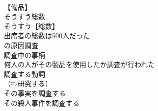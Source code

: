 \documentclass[8pt]{extreport}
\begin{document}
\begin{CJK}{UTF8}{min}
\\	【備品】
\\	そうすう総数		
\\	そうすう【総数】 
\\	出席者の総数は500人だった 
\\	[(達した) 
\\	測定（する）		
\\	そくてい【測定】名詞 
\\	時間の測定 
\\	測定する動詞 
\\	（⇨測る）
\\	対象		
\\	たいしょう【対象】 
\\	【行為思考感情などの】 
\\	〖非難などの〗
\\	研究の対象 
\\	[(題目) 
\\	輸入（ゆにゅう）制限（せいげん）の対象となっている食品（しょくひん） 
\\	彼のふるまいはしばしば非難の対象となった 
\\	【目標】 
\\	子供を対象とした本 
\\	この歴史書は高校生を対象に書かれている 
\\	調査（する）		
\\	ちょうさ【調査】名詞 
\\	【質問などによる】
\\	【学術的な】
\\	（研究⇨類語）【統計測量などによる】
\\	使い分け 
\\	調査検査の意を表す一般的な語
\\	公的機関などによる詳しい事実原因の調査
\\	市場調査 
\\	実地調査 
\\	身辺調査 【身元調査】
\\	（⇨身元） 
\\	実態調査 （⇨実態） 
\\	調査方法 
\\	その事故[伝染病]の原因調査 
\\	調査中の事柄 
\\	何人の人がその製品を使用したか調査が行われた 
\\	調査する動詞 
\\	（⇨研究する） 
\\	その事実を調査する 
\\	その殺人事件を調査する 

\end{CJK}
\end{document}
